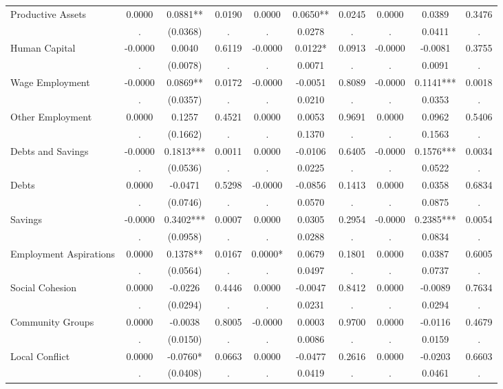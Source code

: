 \begin{tabular}{l*{9}{c}}
Productive Assets & 0.0000 & 0.0881** & 0.0190 & 0.0000 & 0.0650** & 0.0245 & 0.0000 & 0.0389 & 0.3476 \\
  & . & (0.0368) & . & . & 0.0278 & . & . & 0.0411 & . \\
Human Capital & -0.0000 & 0.0040 & 0.6119 & -0.0000 & 0.0122* & 0.0913 & -0.0000 & -0.0081 & 0.3755 \\
  & . & (0.0078) & . & . & 0.0071 & . & . & 0.0091 & . \\
Wage Employment & -0.0000 & 0.0869** & 0.0172 & -0.0000 & -0.0051 & 0.8089 & -0.0000 & 0.1141*** & 0.0018 \\
  & . & (0.0357) & . & . & 0.0210 & . & . & 0.0353 & . \\
Other Employment & 0.0000 & 0.1257 & 0.4521 & 0.0000 & 0.0053 & 0.9691 & 0.0000 & 0.0962 & 0.5406 \\
  & . & (0.1662) & . & . & 0.1370 & . & . & 0.1563 & . \\
Debts and Savings & -0.0000 & 0.1813*** & 0.0011 & 0.0000 & -0.0106 & 0.6405 & -0.0000 & 0.1576*** & 0.0034 \\
  & . & (0.0536) & . & . & 0.0225 & . & . & 0.0522 & . \\
Debts & 0.0000 & -0.0471 & 0.5298 & -0.0000 & -0.0856 & 0.1413 & 0.0000 & 0.0358 & 0.6834 \\
  & . & (0.0746) & . & . & 0.0570 & . & . & 0.0875 & . \\
Savings & -0.0000 & 0.3402*** & 0.0007 & 0.0000 & 0.0305 & 0.2954 & -0.0000 & 0.2385*** & 0.0054 \\
  & . & (0.0958) & . & . & 0.0288 & . & . & 0.0834 & . \\
Employment Aspirations & 0.0000 & 0.1378** & 0.0167 & 0.0000* & 0.0679 & 0.1801 & 0.0000 & 0.0387 & 0.6005 \\
  & . & (0.0564) & . & . & 0.0497 & . & . & 0.0737 & . \\
Social Cohesion & 0.0000 & -0.0226 & 0.4446 & 0.0000 & -0.0047 & 0.8412 & 0.0000 & -0.0089 & 0.7634 \\
  & . & (0.0294) & . & . & 0.0231 & . & . & 0.0294 & . \\
Community Groups & 0.0000 & -0.0038 & 0.8005 & -0.0000 & 0.0003 & 0.9700 & 0.0000 & -0.0116 & 0.4679 \\
  & . & (0.0150) & . & . & 0.0086 & . & . & 0.0159 & . \\
Local Conflict & 0.0000 & -0.0760* & 0.0663 & 0.0000 & -0.0477 & 0.2616 & 0.0000 & -0.0203 & 0.6603 \\
  & . & (0.0408) & . & . & 0.0419 & . & . & 0.0461 & . \\

\end{tabular}
